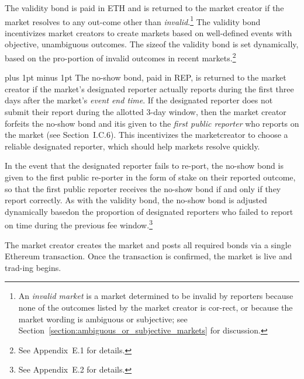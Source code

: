 \documentclass[12pt,floatfix,reprint,nofootinbib,amsmath,amssymb,epsfig,pre,floats,letterpaper,groupedaffiliation]{revtex4-1}
\theoremstyle{definition}
\theoremstyle{definition}
\begin{document}
The validity bond is paid in ETH and is returned to the market creator if the market resolves to any out-\linebreak come other than \textit{invalid}.\footnote{An \textit{invalid market} is a market determined to be invalid by reporters because none of the outcomes listed by the market creator is cor-\linebreak rect, or because the market wording is ambiguous or subjective; see Section~\ref{section:ambiguous_or_subjective_markets} for discussion.} The validity bond incentivizes market creators to create markets based on well-defined events with objective, unambiguous outcomes. The size\linebreak of the validity bond is set dynamically, based on the pro-\linebreak portion of invalid outcomes in recent markets.\footnote{See Appendix~E.1 for details.}

{\font plus 1pt minus 1pt
The no-show bond, paid in REP, is returned to the market creator if the market's designated reporter actually reports during the first three days after the market's \textit{event end time}. If the designated reporter does not submit their report during the allotted 3-day window, then the market creator forfeits the no-show bond and it\linebreak is given to the \textit{first public reporter} who reports on the market (see Section~I.C.6). This incentivizes the market\linebreak creator to choose a reliable designated reporter, which should help markets resolve quickly.} 

\vspace{\baselineskip}In the event that the designated reporter fails to re-\linebreak port, the no-show bond is given to the first public re-\linebreak porter in the form of stake on their reported outcome, so that the first public reporter receives the no-show bond if and only if they report correctly. As with the validity bond, the no-show bond is adjusted dynamically based\linebreak on the proportion of designated reporters who failed to report on time during the previous fee window.\footnote{See Appendix~E.2 for details.}

The market creator creates the market and posts all required bonds via a single Ethereum transaction. Once the transaction is confirmed, the market is live and trad-\linebreak ing begins.
\end{document}
